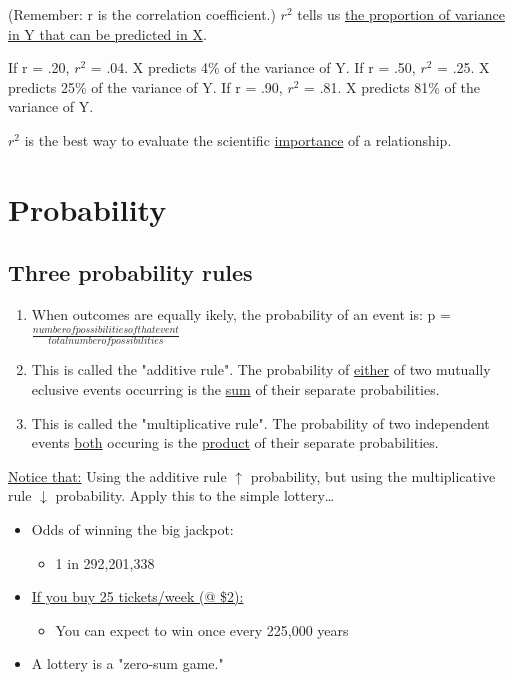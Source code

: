 \documentclass[11pt]{report}
\begin{document}
(Remember: r is the correlation coefficient.)\newline 
$r^2$ tells us \underline{the proportion of variance in Y that can be predicted in X}. \newline

\begin{multicols}{3}
    If r = .20, $r^2$ = .04. X predicts 4\% of the variance of Y. 
    \columnbreak
    If r = .50, $r^2$ = .25. X predicts 25\% of the variance of Y. 
    \columnbreak
    If r = .90, $r^2$ = .81. X predicts 81\% of the variance of Y.
\end{multicols}
\noindent $r^2$ is the best way to evaluate the scientific \underline{importance} of a relationship. 

\section{Probability}

\subsection{Three probability rules}
\begin{enumerate}
    \item When outcomes are equally ikely, the probability of an event is: p = $\frac{number of possibilities of that event}{total number of possibilities}$
    \item This is called the "additive rule". The probability of \underline{either} of two mutually eclusive events occurring is the \underline{sum} of their separate probabilities.
    \item This is called the "multiplicative rule". The probability of two independent events \underline{both} occuring is the \underline{product} of their separate probabilities.
\end{enumerate}

\underline{Notice that:} Using the additive rule $\uparrow$ probability, but using the multiplicative rule $\downarrow$ probability. Apply this to the simple lottery\dots

{
    \begin{itemize}
        \item Odds of winning the big jackpot:
        \begin{itemize}
            \item 1 in 292,201,338
        \end{itemize}
        \item \underline{If you buy 25 tickets/week (@ \$2):}
        \begin{itemize}
            \item You can expect to win once every 225,000 years
        \end{itemize}
        \item A lottery is a "zero-sum game."
    \end{itemize}
}
\end{document}

